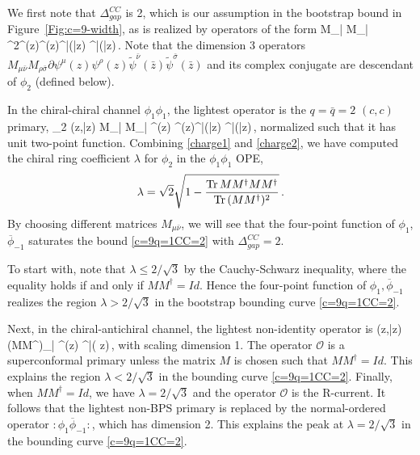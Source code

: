 \documentclass[12pt]{article}
\begin{document}
We first note that $\Delta^{CC}_{gap}$ is  2, which is our assumption in the bootstrap bound in Figure~\ref{Fig:c=9-width}, as is realized by operators of the form
\ie
M_{\mu\bar\nu} M_{\rho\bar \sigma} \partial^2\psi^\mu(z)\psi^\rho(z)\tilde \psi^{\bar \nu}(\bar z) \tilde \psi^{\bar \sigma}(\bar z)\,.
\fe
   Note that the  dimension 3 operators $M_{\mu\bar\nu} M_{\rho\bar \sigma} \partial\psi^\mu(z) \psi^\rho(z)\tilde \psi^{\bar \nu}(\bar z) \tilde \psi^{\bar \sigma}(\bar z)$ and its complex conjugate are descendant of $\phi_2$ (defined below).
 
 
In the chiral-chiral channel $\phi_1\phi_1$, the lightest operator is the $q=\bar q=2$ $(c,c)$ primary,
\ie\label{charge2}
\phi_2 (z,\bar z)  
M_{\mu\bar\nu} M_{\rho\bar \sigma} \psi^\mu(z) \psi^\rho(z)\tilde \psi^{\bar \nu}(\bar z) \tilde \psi^{\bar \sigma}(\bar z)\,,
\fe
normalized such that it has unit two-point function. Combining \eqref{charge1} and \eqref{charge2}, we  have computed the chiral ring coefficient $\lambda$ for $\phi_2$ in the $\phi_1\phi_1$ OPE,
\begin{align}\label{c=9lambda}
\lambda = \sqrt{2}  \sqrt{1 - {  {\rm Tr\,} MM^\dagger M M^\dagger\over {\rm Tr\,}(MM^\dagger)^2}  }\,.
\end{align}
By choosing different matrices $M_{\mu\bar \nu}$, we will see that the four-point function of $\phi_1$, $\overline\phi_{-1}$ saturates the bound \eqref{c=9q=1CC=2} with $\Delta^{CC}_{gap}=2$.  

To start with, note that $\lambda\le2/\sqrt{3}$ by the Cauchy-Schwarz inequality, where the equality holds if and only if $MM^\dagger =Id$.  Hence the four-point function of $\phi_1,\overline\phi_{-1}$ realizes the region $\lambda>2/\sqrt{3}$ in the bootstrap bounding curve \eqref{c=9q=1CC=2}.



Next, in the chiral-antichiral channel, the lightest non-identity operator is
\ie
{}(z,\bar z)\equiv(MM^\dagger)_{\mu\bar\nu} \psi^\mu(z) \tilde\psi^{\bar\nu}( z)\,,
\fe
with scaling dimension 1. The operator $\mathcal{O}$ is a superconformal primary unless the matrix $M$ is chosen such that $MM^\dagger=Id$.  This explains the region $\lambda<2/\sqrt{3}$ in the bounding curve \eqref{c=9q=1CC=2}.  Finally, when $MM^\dagger=Id$, we have $\lambda=2/\sqrt{3}$ and the operator $\mathcal{O}$ is the R-current. It follows that the lightest non-BPS primary is replaced by the normal-ordered operator  $:\phi_1\overline\phi_{-1}:$, which has dimension 2. This explains the peak at $\lambda=2/\sqrt{3}$ in the bounding curve \eqref{c=9q=1CC=2}.  
\end{document}
